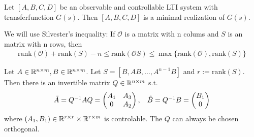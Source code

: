 \begin{lem}
	Let $[A,B,C,D] $ be an observable and controllable LTI system with transferfunction $G(s)$. Then $[A,B,C,D]$ is a minimal realization of $G(s)$. 
\end{lem}

\begin{rem}
	We will use Silvester's inequality: If $\mathcal{O}$ is a matrix with n colums and $S$ is an matrix with n rows, then
	\begin{align*}
		\text{rank}(\mathcal{O}) + \text{rank}(S) - n \leq \text{rank}(\mathcal{O}S) \leq \max \{\text{rank}(\mathcal{O}), \text{rank}(S) \}
	\end{align*}
\end{rem}

\begin{lem}
	Let $A \in \mathbb{R}^{n \times m}, B \in \mathbb{R}^{n \times m}$. Let $S=[B,AB, \dots, A^{n-1}B]$ and $r:=\text{rank}(S)$. Then there is an invertible matrix $Q \in \mathbb{R}^{n \times m}$ s.t.
	\begin{align*}
		\tilde{A}=Q^{-1}A Q= 
		\begin{pmatrix}
		A_1 & A_3 \\ 0 & A_2
		\end{pmatrix}, \hspace{2ex} \tilde{B}= Q^{-1} B = \begin{pmatrix}
		B_1 \\ 0
		\end{pmatrix} 
	\end{align*}
	where $(A_1,B_1) \in \mathbb{R}^{r \times r} \times \mathbb{R}^{r \times m}$ is controlable. The $Q$ can always be chosen orthogonal.  
\end{lem}

